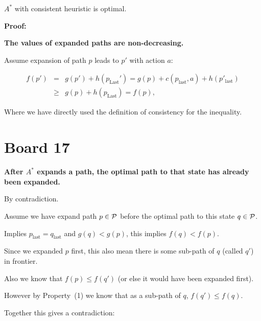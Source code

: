 \documentclass[10pt]{article}
\begin{document}
\begin{theorem}
  $A^*$  with consistent heuristic is optimal.
\end{theorem}

\noindent \textbf{Proof:}


\textbf{The values of expanded paths are non-decreasing.}

Assume expansion of path $p$ leads to $p'$ with action $a$:

\begin{eqnarray*}
f(p') &=& g(p') + h(p_{\mathrm{Last}}') = g(p) + c(p_{\mathrm{last}}, a) + h(p'_{\mathrm{last}})  \\
&\geq & g(p) + h(p_{\mathrm{Last}}) =f(p),
\end{eqnarray*}

\noindent Where we have directly used the definition of consistency for the inequality.

\section{Board 17}

\textbf{ After $A^*$ expands a path, the optimal path to that state has already been expanded. }

By contradiction.

Assume we have expand path $p \in \mathcal{P}$ before the optimal path to this state $q \in \mathcal{P}$. 

\air 
Implies $p_{\mathrm{last}} =q_\mathrm{last}$ and  $g(q) < g(p)$, this implies $f(q) < f(p)$.
\air

Since we expanded $p$ first, this also mean there is some sub-path
of $q$ (called $q'$) in frontier.
\air


 Also we know that $f(p) \leq f(q')$ (or else it would have been expanded first).

\air

However by Property~(1) we know that as a sub-path of $q$, $f(q') \leq f(q)$. 
\air 

Together this gives a contradiction:



\QED

\end{document}
